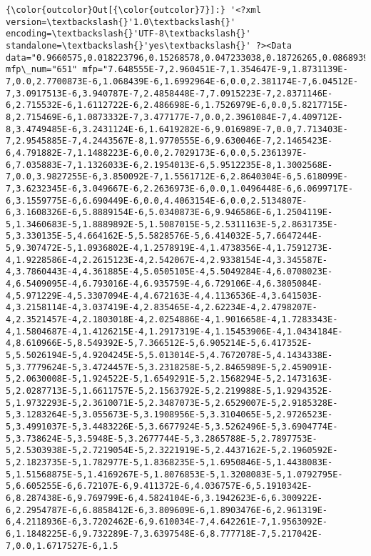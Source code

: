 \documentclass[11pt]{article}
\begin{document}
\begin{Verbatim}[commandchars=\\\{\}]
{\color{outcolor}Out[{\color{outcolor}7}]:} '<?xml version=\textbackslash{}'1.0\textbackslash{}' encoding=\textbackslash{}'UTF-8\textbackslash{}' standalone=\textbackslash{}'yes\textbackslash{}' ?><Data data="0.9660575,0.018223796,0.15268578,0.047233038,0.18726265,0.08689399,0.18726267,0.130341,14.059301,100000.0,-0.17917678,460.86,450.0,15.1302185,94.698715,1.97159,45.5222,52.50621,-27.28104,5.611103,6.8188424,-96.39908,-85.900154,14.377438,-9.968724,-23.636877,-29.150871,-210.49924,-116.667305,-122.93641,-45.450176,6.9457746,-6.304487,33.324524,20988.0,1968.75,350.0,1000.0,1.0,1.0,5" mfp\_num="651" mfp="7.648555E-7,2.960451E-7,1.354647E-9,1.8731139E-7,0.0,2.7700873E-6,1.068439E-6,1.6992964E-6,0.0,2.381174E-7,6.04512E-7,3.0917513E-6,3.940787E-7,2.4858448E-7,7.0915223E-7,2.8371146E-6,2.715532E-6,1.6112722E-6,2.486698E-6,1.7526979E-6,0.0,5.8217715E-8,2.715469E-6,1.0873332E-7,3.477177E-7,0.0,2.3961084E-7,4.409712E-8,3.4749485E-6,3.2431124E-6,1.6419282E-6,9.016989E-7,0.0,7.713403E-7,2.9545885E-7,4.2443567E-8,1.9770555E-6,9.630046E-7,2.1465423E-6,4.791882E-7,1.1488223E-6,0.0,2.7029173E-6,0.0,5.2361397E-6,7.035883E-7,1.1326033E-6,2.1954013E-6,5.9512235E-8,1.3002568E-7,0.0,3.9827255E-6,3.850092E-7,1.5561712E-6,2.8640304E-6,5.618099E-7,3.6232345E-6,3.049667E-6,2.2636973E-6,0.0,1.0496448E-6,6.0699717E-6,3.1559775E-6,6.690449E-6,0.0,4.4063154E-6,0.0,2.5134807E-6,3.1608326E-6,5.8889154E-6,5.0340873E-6,9.946586E-6,1.2504119E-5,1.3460683E-5,1.8889892E-5,1.5087015E-5,2.5311163E-5,2.8631735E-5,3.330135E-5,4.664162E-5,5.5828576E-5,6.414032E-5,7.6647244E-5,9.307472E-5,1.0936802E-4,1.2578919E-4,1.4738356E-4,1.7591273E-4,1.9228586E-4,2.2615123E-4,2.542067E-4,2.9338154E-4,3.345587E-4,3.7860443E-4,4.361885E-4,5.0505105E-4,5.5049284E-4,6.0708023E-4,6.5409095E-4,6.793016E-4,6.935759E-4,6.729106E-4,6.3805084E-4,5.971229E-4,5.3307094E-4,4.672163E-4,4.1136536E-4,3.641503E-4,3.2158114E-4,3.037419E-4,2.835465E-4,2.62234E-4,2.4798207E-4,2.3521457E-4,2.1803018E-4,2.0254886E-4,1.9016658E-4,1.7283343E-4,1.5804687E-4,1.4126215E-4,1.2917319E-4,1.15453906E-4,1.0434184E-4,8.610966E-5,8.549392E-5,7.366512E-5,6.905214E-5,6.417352E-5,5.5026194E-5,4.9204245E-5,5.013014E-5,4.7672078E-5,4.1434338E-5,3.7779624E-5,3.4724457E-5,3.2318258E-5,2.8465989E-5,2.459091E-5,2.0630008E-5,1.924522E-5,1.6549291E-5,2.1568294E-5,2.1473163E-5,2.0287713E-5,1.6611757E-5,2.1563792E-5,2.219988E-5,1.9294352E-5,1.9732293E-5,2.3610071E-5,2.3487073E-5,2.6529007E-5,2.9185328E-5,3.1283264E-5,3.055673E-5,3.1908956E-5,3.3104065E-5,2.9726523E-5,3.4991037E-5,3.4483226E-5,3.6677924E-5,3.5262496E-5,3.6904774E-5,3.738624E-5,3.5948E-5,3.2677744E-5,3.2865788E-5,2.7897753E-5,2.5303938E-5,2.7219054E-5,2.3221919E-5,2.4437162E-5,2.1960592E-5,2.1823735E-5,1.782977E-5,1.8368235E-5,1.6950846E-5,1.4438083E-5,1.51568875E-5,1.4169267E-5,1.8076853E-5,1.3208083E-5,1.0792795E-5,6.605255E-6,6.72107E-6,9.411372E-6,4.036757E-6,5.1910342E-6,8.287438E-6,9.769799E-6,4.5824104E-6,3.1942623E-6,6.300922E-6,2.2954787E-6,6.8858412E-6,3.809609E-6,1.8903476E-6,2.961319E-6,4.2118936E-6,3.7202462E-6,9.610034E-7,4.642261E-7,1.9563092E-6,1.1848225E-6,9.732289E-7,3.6397548E-6,8.777718E-7,5.217042E-7,0.0,1.6717527E-6,1.5
\end{Verbatim}
\end{document}
